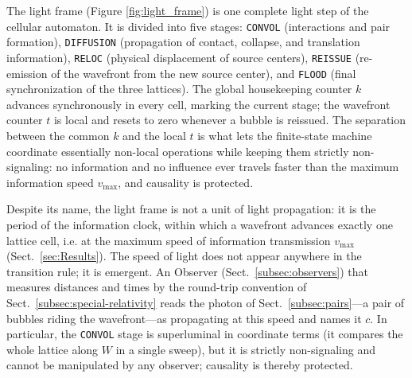 \documentclass{ijuc}
\begin{document}
The light frame (Figure \ref{fig:light_frame}) is one complete light step of the cellular automaton. It is divided into five stages: \texttt{CONVOL} (interactions and pair formation), \texttt{DIFFUSION} (propagation of contact, collapse, and translation information), \texttt{RELOC} (physical displacement of source centers), \texttt{REISSUE} (re-emission of the wavefront from the new source center), and \texttt{FLOOD} (final synchronization of the three lattices). The global housekeeping counter $k$ advances synchronously in every cell, marking the current stage; the wavefront counter $t$ is local and resets to zero whenever a bubble is reissued. The separation between the common $k$ and the local $t$ is what lets the finite-state machine coordinate essentially non-local operations while keeping them strictly non-signaling: no information and no influence ever travels faster than the maximum information speed $v_{\max}$, and causality is protected.

Despite its name, the light frame is not a unit of light propagation: it is the period of the information clock, within which a wavefront advances exactly one lattice cell, i.e. at the maximum speed of information transmission $v_{\max}$ (Sect.~\ref{sec:Results}). The speed of light does not appear anywhere in the transition rule; it is emergent. An Observer (Sect.~\ref{subsec:observers}) that measures distances and times by the round-trip convention of Sect.~\ref{subsec:special-relativity} reads the photon of Sect.~\ref{subsec:pairs}---a pair of bubbles riding the wavefront---as propagating at this speed and names it $c$. In particular, the \texttt{CONVOL} stage is superluminal in coordinate terms (it compares the whole lattice along $W$ in a single sweep), but it is strictly non-signaling and cannot be manipulated by any observer; causality is thereby protected.
\end{document}
